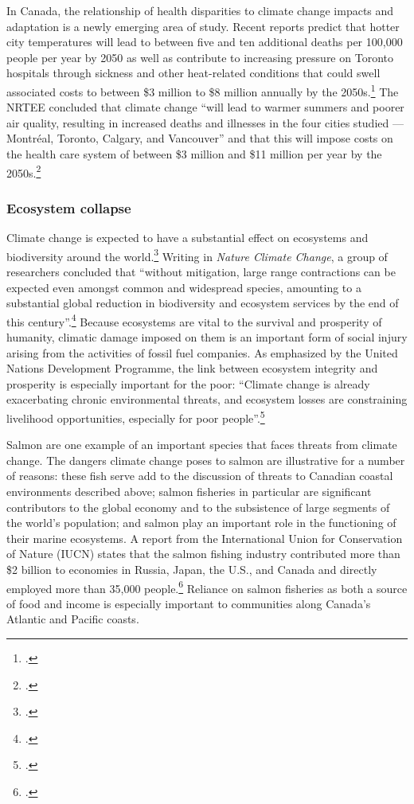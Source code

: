 \documentclass[10pt]{article}
\begin{document}
In Canada, the relationship of health disparities to climate change impacts and adaptation is a newly emerging area of study. 
Recent reports predict that hotter city temperatures will lead to between five and ten additional deaths per 100,000 people per year by 2050 as well as contribute to increasing pressure on Toronto hospitals through sickness and other heat-related conditions that could swell associated costs to between \$3 million to \$8 million annually by the 2050s.\footcite[][p. 87]{NRTEEPrice}
The NRTEE concluded that climate change ``will lead to warmer summers and poorer air quality, resulting in increased deaths and illnesses in the four cities studied — Montréal, Toronto, Calgary, and Vancouver'' and that this will impose costs on the health care system of between \$3 million and \$11 million per year by the 2050s.\footcite[][p. 16]{NRTEEPrice}



	\subsubsection{Ecosystem collapse}



Climate change is expected to have a substantial effect on ecosystems and biodiversity around the world.\footcite[][p. 1]{VulnerableSpecies}
Writing in \emph{Nature Climate Change}, a group of researchers concluded that ``without mitigation, large range contractions can be expected even amongst common and widespread species, amounting to a substantial global reduction in biodiversity and ecosystem services by the end of this century''.\footcite[][p. 1]{WarrenBiodiversity}
Because ecosystems are vital to the survival and prosperity of humanity, climatic damage imposed on them is an important form of social injury arising from the activities of fossil fuel companies.
As emphasized by the United Nations Development Programme, the link between ecosystem integrity and prosperity is especially important for the poor: ``Climate change is already exacerbating chronic environmental threats, and ecosystem losses are constraining livelihood opportunities, especially for poor people''.\footcite[][p. 95]{UNHumanDev2013}



Salmon are one example of an important species that faces threats from climate change. 
The dangers climate change poses to salmon are illustrative for a number of reasons: these fish serve add to the discussion of threats to Canadian coastal environments described above; salmon fisheries in particular are significant contributors to the global economy and to the subsistence of large segments of the world’s population; and salmon play an important role in the functioning of their marine ecosystems.
A report from the International Union for Conservation of Nature (IUCN) states that the salmon fishing industry contributed more than \$2 billion to economies in Russia, Japan, the U.S., and Canada and directly employed more than 35,000 people.\footcite[][p. 2]{IUCNSalmon}
Reliance on salmon fisheries as both a source of food and income is especially important to communities along Canada's Atlantic and Pacific coasts. 
\end{document}
